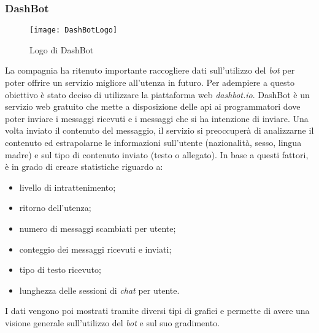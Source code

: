 \subsubsection{DashBot}
\begin{figure}[H]
  \centering
  \texttt{[image: DashBotLogo]}
  \caption{Logo di DashBot}
\end{figure}
La compagnia ha ritenuto importante raccogliere dati sull'utilizzo del
\textit{bot} per poter offrire un servizio migliore all'utenza in futuro. Per
adempiere a questo obiettivo è stato deciso di utilizzare la piattaforma web
\textit{dashbot.io}. DashBot è un servizio web gratuito che mette a
disposizione delle \gls{api} ai programmatori dove poter inviare i messaggi
ricevuti e i messaggi che si ha intenzione di inviare. Una volta inviato il
contenuto del messaggio, il servizio si preoccuperà di analizzarne il contenuto
ed estrapolarne le informazioni sull'utente (nazionalità, sesso, lingua madre)
e sul tipo di contenuto inviato (testo o allegato). In base a questi fattori, è
in grado di creare statistiche riguardo a:
\begin{itemize}
  \item livello di intrattenimento;
  \item ritorno dell'utenza;
  \item numero di messaggi scambiati per utente;
  \item conteggio dei messaggi ricevuti e inviati;
  \item tipo di testo ricevuto;
  \item lunghezza delle sessioni di \textit{chat} per utente.
\end{itemize}
I dati vengono poi mostrati tramite diversi tipi di grafici e permette di avere
una visione generale sull'utilizzo del \textit{bot} e sul suo gradimento.
